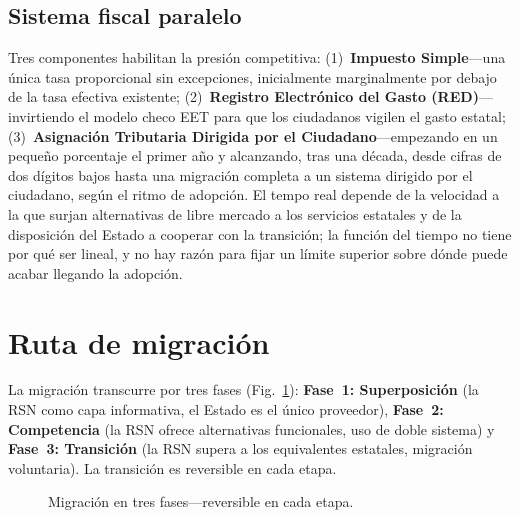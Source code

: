 \documentclass[11pt,a4paper,twocolumn]{article}
\begin{document}
\subsection{Sistema fiscal paralelo}

Tres componentes habilitan la presión competitiva: (1)~\textbf{Impuesto Simple}---una única tasa proporcional sin excepciones, inicialmente marginalmente por debajo de la tasa efectiva existente; (2)~\textbf{Registro Electrónico del Gasto (RED)}---invirtiendo el modelo checo EET para que los ciudadanos vigilen el gasto estatal; (3)~\textbf{Asignación Tributaria Dirigida por el Ciudadano}---empezando en un pequeño porcentaje el primer año y alcanzando, tras una década, desde cifras de dos dígitos bajos hasta una migración completa a un sistema dirigido por el ciudadano, según el ritmo de adopción. El tempo real depende de la velocidad a la que surjan alternativas de libre mercado a los servicios estatales y de la disposición del Estado a cooperar con la transición; la función del tiempo no tiene por qué ser lineal, y no hay razón para fijar un límite superior sobre dónde puede acabar llegando la adopción.

\section{Ruta de migración}

La migración transcurre por tres fases (Fig.~\ref{fig:migration}): \textbf{Fase~1: Superposición} (la RSN como capa informativa, el Estado es el único proveedor), \textbf{Fase~2: Competencia} (la RSN ofrece alternativas funcionales, uso de doble sistema) y \textbf{Fase~3: Transición} (la RSN supera a los equivalentes estatales, migración voluntaria). La transición es reversible en cada etapa.

\begin{figure}[ht]
\centering
{}
\caption{Migración en tres fases---reversible en cada etapa.}
\label{fig:migration}
\end{figure}
\end{document}
